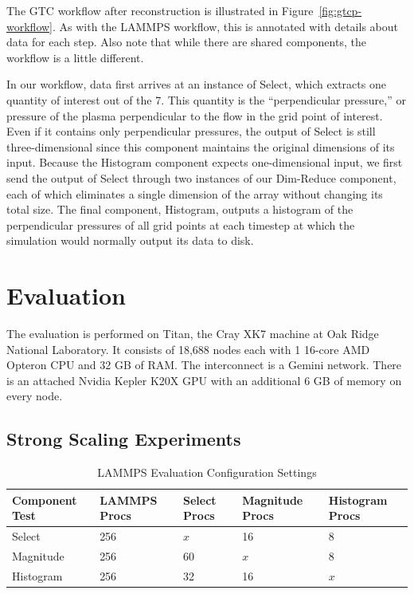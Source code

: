 \documentclass[conference]{IEEEtran}
\begin{document}
The GTC workflow after reconstruction is illustrated in
Figure~\ref{fig:gtcp-workflow}. As with the LAMMPS workflow, this is annotated
with details about data for each step. Also note that while there are shared
components, the workflow is a little different.

In our workflow, data first arrives at an instance of Select, which extracts
one quantity of interest out of the 7. This quantity is the ``perpendicular
pressure,'' or pressure of the plasma perpendicular to the flow in the grid
point of interest. Even if it contains only perpendicular pressures, the output
of Select is still three-dimensional since this component maintains the
original dimensions of its input. Because the Histogram component expects
one-dimensional input, we first send the output of Select through two instances
of our Dim-Reduce component, each of which eliminates a single dimension of the
array without changing its total size. The final component, Histogram, outputs
a histogram of the perpendicular pressures of all grid points at each timestep
at which the simulation would normally output its data to disk.

\section{Evaluation}
\label{s:eval}

The evaluation is performed on Titan, the Cray XK7 machine at Oak Ridge
National Laboratory. It consists of 18,688 nodes each with 1 16-core AMD
Opteron CPU and 32 GB of RAM. The interconnect is a Gemini network. There is an
attached Nvidia Kepler K20X GPU with an additional 6 GB of memory on every
node.


\subsection{Strong Scaling Experiments}

\begin{table}[tbp]
\centering
\caption{LAMMPS Evaluation Configuration Settings}
\label{tab:eval-strong-lammps}
\vspace{-0.15in}
\begin{tabular}{|l|l|l|l|l|}
\hline
Component Test & LAMMPS Procs & Select Procs & Magnitude Procs & Histogram Procs \\
\hline
Select & 256 & $x$ & 16 & 8\\
\hline
Magnitude & 256 & 60 & $x$ & 8\\
\hline
Histogram & 256 & 32 & 16 & $x$\\
\hline
\end{tabular}
\vspace{-0.15in}
\end{table}
\end{document}
